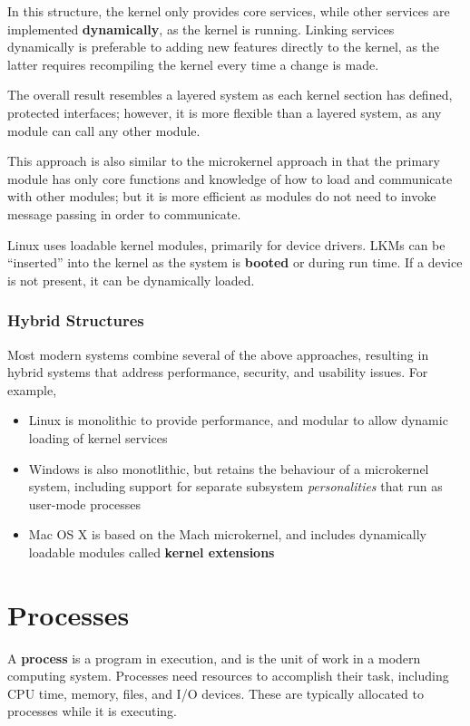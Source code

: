 \documentclass{article}
\begin{document}
In this structure, the kernel only provides core services, while other
services are implemented \textbf{dynamically}, as the kernel is
running. Linking services dynamically is preferable to adding new
features directly to the kernel, as the latter requires recompiling the
kernel every time a change is made.

The overall result resembles a layered system as each kernel section
has defined, protected interfaces; however, it is more flexible than a
layered system, as any module can call any other module.

This approach is also similar to the microkernel approach in that the
primary module has only core functions and knowledge of how to load and
communicate with other modules; but it is more efficient as modules do
not need to invoke message passing in order to communicate.

Linux uses loadable kernel modules, primarily for device drivers. LKMs
can be ``inserted'' into the kernel as the system is \textbf{booted} or
during run time. If a device is not present, it can be dynamically
loaded.
\subsubsection{Hybrid Structures}
Most modern systems combine several of the above approaches, resulting
in hybrid systems that address performance, security, and usability
issues. For example,
\begin{itemize}
    \item Linux is monolithic to provide performance, and modular to
          allow dynamic loading of kernel services
    \item Windows is also monotlithic, but retains the behaviour of a
          microkernel system, including support for separate subsystem
          \textit{personalities} that run as user-mode processes
    \item Mac OS X is based on the Mach microkernel, and includes
          dynamically loadable modules called \textbf{kernel
          extensions}
\end{itemize}
\section{Processes}
A \textbf{process} is a program in execution, and is the unit of work
in a modern computing system. Processes need resources to accomplish
their task, including CPU time, memory, files, and I/O devices. These
are typically allocated to processes while it is executing.
\end{document}
